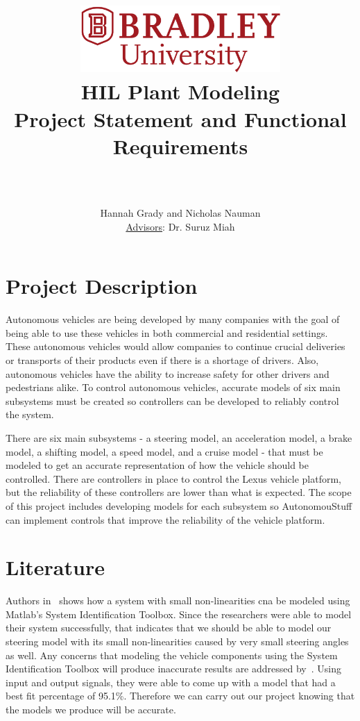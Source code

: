 \documentclass[12pt]{article} %
\title{
    \begin{center}
        \href{http://www.bradley.edu}{\includegraphics[height=1in]{figs/logoBU1-Print}}
        \vskip10pt
        \HRule \\[0.4cm]
        {\Huge \bfseries HIL Plant Modeling \\\Large Project Statement and Functional Requirements}\\[0.4cm] %
        \HRule \\[0.4cm]
    \end{center}
    }
\author{Hannah Grady and Nicholas Nauman \\ \underline{Advisors}: Dr. Suruz Miah}
\begin{document}
\maketitle

\newpage %

\section{Project Description}
Autonomous vehicles are being developed by many companies with the goal of being able to use these vehicles in both commercial and residential settings. These autonomous vehicles would allow companies to continue crucial deliveries or transports of their products even if there is a shortage of drivers. Also, autonomous vehicles have the ability to increase safety for other drivers and pedestrians alike. To control autonomous vehicles, accurate models of six main subsystems must be created so controllers can be developed to reliably control the system.

There are six main subsystems - a steering model, an acceleration model, a brake model, a shifting model, a speed model, and a cruise model - that must be modeled to get an accurate representation of how the vehicle should be controlled. There are controllers in place to control the Lexus vehicle platform, but the reliability of these controllers are lower than what is expected. The scope of this project includes developing models for each subsystem so AutonomouStuff can implement controls that improve the reliability of the vehicle platform.


\section{Literature}
\label{sec:Literature}

Authors in~\cite{Adnan2010} shows how a system with small non-linearities cna be modeled using Matlab's System Identification Toolbox. Since the researchers were able to model their system successfully, that indicates that we should be able to model our steering model with its small non-linearities caused by very small steering angles as well. Any concerns that modeling the vehicle components using the System Identification Toolbox will produce inaccurate results are addressed by~\cite{Donjaroennon2021}. Using input and output signals, they were able to come up with a model that had a best fit percentage of 95.1\%. Therefore we can carry out our project knowing that the models we produce will be accurate. 
\end{document}
